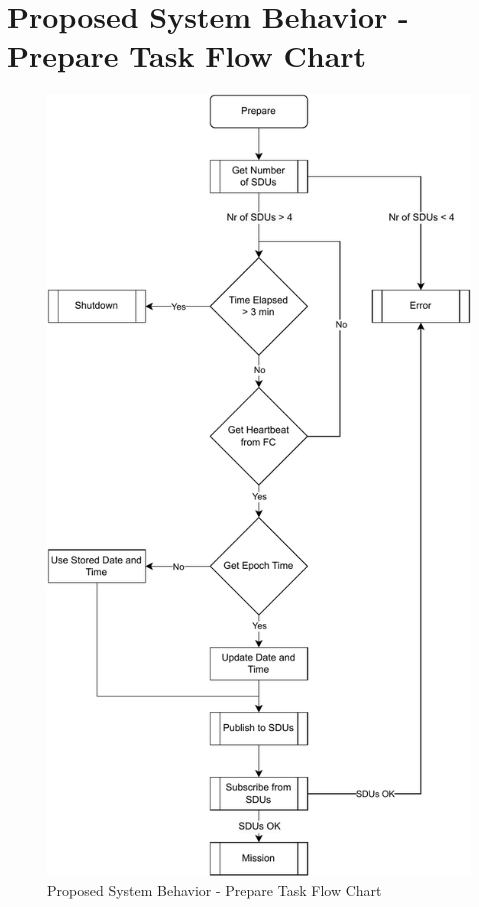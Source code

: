 
\chapter{Proposed System Behavior - Prepare Task Flow Chart} %

\label{AppendixA} %

\begin{figure}[H]
    \centering
    \includegraphics[scale=0.7]{ch3/assets/MDU_PREPARE.pdf}
    \caption{Proposed System Behavior - Prepare Task Flow Chart}
    \label{fig:MDU_PREPARE}
\end{figure}

